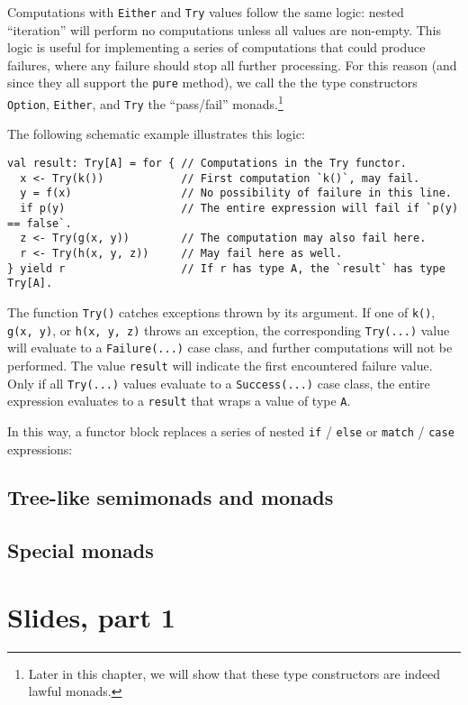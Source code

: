Computations with \lstinline!Either! and \lstinline!Try! values
follow the same logic: nested ``iteration'' will perform no computations
unless all values are non-empty. This logic is useful for implementing
a series of computations that could produce failures, where any failure
should stop all further processing. For this reason (and since they
all support the \lstinline!pure! method), we call the the type constructors
\lstinline!Option!, \lstinline!Either!, and \lstinline!Try! the
``pass/fail'' monads.\footnote{Later in this chapter, we will show that these type constructors are
indeed lawful monads.}

The following schematic example illustrates this logic:
\begin{lstlisting}
val result: Try[A] = for { // Computations in the Try functor.
  x <- Try(k())            // First computation `k()`, may fail.
  y = f(x)                 // No possibility of failure in this line.
  if p(y)                  // The entire expression will fail if `p(y) == false`.
  z <- Try(g(x, y))        // The computation may also fail here.
  r <- Try(h(x, y, z))     // May fail here as well.
} yield r                  // If r has type A, the `result` has type Try[A].
\end{lstlisting}
The function \lstinline!Try()! catches exceptions thrown by its argument.
If one of \lstinline!k()!, \lstinline!g(x, y)!, or \lstinline!h(x, y, z)!
throws an exception, the corresponding \lstinline!Try(...)! value
will evaluate to a \lstinline!Failure(...)! case class, and further
computations will not be performed. The value \lstinline!result!
will indicate the first encountered failure value. Only if all \lstinline!Try(...)!
values evaluate to a \lstinline!Success(...)! case class, the entire
expression evaluates to a \lstinline!result! that wraps a value of
type \lstinline!A!.

In this way, a functor block replaces a series of nested \lstinline!if!
/ \lstinline!else! or \lstinline!match! / \lstinline!case! expressions:

\subsection{Tree-like semimonads and monads}

\subsection{Special monads}

\section{Slides, part 1}

